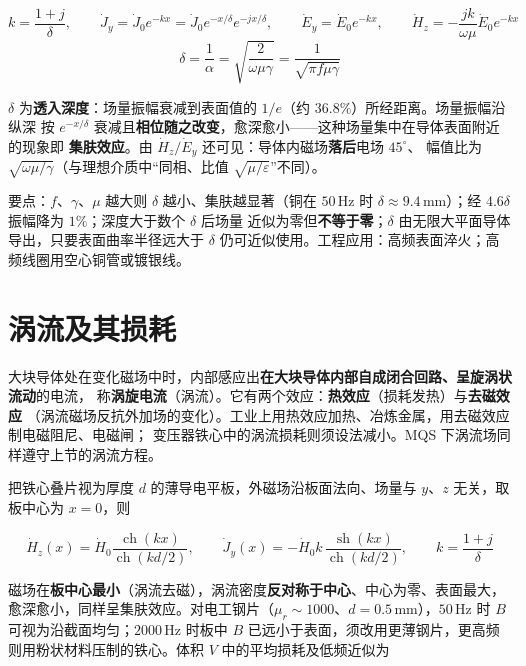 \begin{formulaBox}
\[
k=\frac{1+j}{\delta},
\qquad
\dot{J}_y=\dot{J}_0e^{-kx}=\dot{J}_0e^{-x/\delta}e^{-jx/\delta},
\qquad
\dot{E}_y=\dot{E}_0e^{-kx},
\qquad
\dot{H}_z=-\frac{jk}{\omega\mu}\dot{E}_0e^{-kx}
\]
\[
\delta=\frac{1}{\alpha}=\sqrt{\frac{2}{\omega\mu\gamma}}
=\frac{1}{\sqrt{\pi f\mu\gamma}}
\]
\end{formulaBox}

$\delta$ 为\textbf{透入深度}：场量振幅衰减到表面值的 $1/e$（约 36.8\%）所经距离。场量振幅沿纵深
按 $e^{-x/\delta}$ 衰减且\textbf{相位随之改变}，愈深愈小——这种场量集中在导体表面附近的现象即
\textbf{集肤效应}。由 $\dot{H}_z/\dot{E}_y$ 还可见：导体内磁场\textbf{落后}电场 $45^{\circ}$、
幅值比为 $\sqrt{\omega\mu/\gamma}$（与理想介质中“同相、比值 $\sqrt{\mu/\varepsilon}$”不同）。

要点：$f$、$\gamma$、$\mu$ 越大则 $\delta$ 越小、集肤越显著（铜在 $50\,\mathrm{Hz}$ 时
$\delta\approx9.4\,\mathrm{mm}$）；经 $4.6\delta$ 振幅降为 $1\%$；深度大于数个 $\delta$ 后场量
近似为零但\textbf{不等于零}；$\delta$ 由无限大平面导体导出，只要表面曲率半径远大于 $\delta$
仍可近似使用。工程应用：高频表面淬火；高频线圈用空心铜管或镀银线。

\section{涡流及其损耗}

大块导体处在变化磁场中时，内部感应出\textbf{在大块导体内部自成闭合回路、呈旋涡状流动}的电流，
称\textbf{涡旋电流}（涡流）。它有两个效应：\textbf{热效应}（损耗发热）与\textbf{去磁效应}
（涡流磁场反抗外加场的变化）。工业上用热效应加热、冶炼金属，用去磁效应制电磁阻尼、电磁闸；
变压器铁心中的涡流损耗则须设法减小。MQS 下涡流场同样遵守上节的涡流方程。

把铁心叠片视为厚度 $d$ 的薄导电平板，外磁场沿板面法向、场量与 $y$、$z$ 无关，取板中心为
$x=0$，则

\begin{formulaBox}
\[
\dot{H}_z(x)=\dot{H}_0\frac{\operatorname{ch}(kx)}
{\operatorname{ch}(kd/2)},
\qquad
\dot{J}_y(x)=-\dot{H}_0k\,
\frac{\operatorname{sh}(kx)}{\operatorname{ch}(kd/2)},
\qquad
k=\frac{1+j}{\delta}
\]
\end{formulaBox}

磁场在\textbf{板中心最小}（涡流去磁），涡流密度\textbf{反对称于中心}、中心为零、表面最大，
愈深愈小，同样呈集肤效应。对电工钢片（$\mu_r\sim1000$、$d=0.5\,\mathrm{mm}$），$50\,\mathrm{Hz}$
时 $B$ 可视为沿截面均匀；$2000\,\mathrm{Hz}$ 时板中 $B$ 已远小于表面，须改用更薄钢片，更高频
则用粉状材料压制的铁心。体积 $V$ 中的平均损耗及低频近似为

